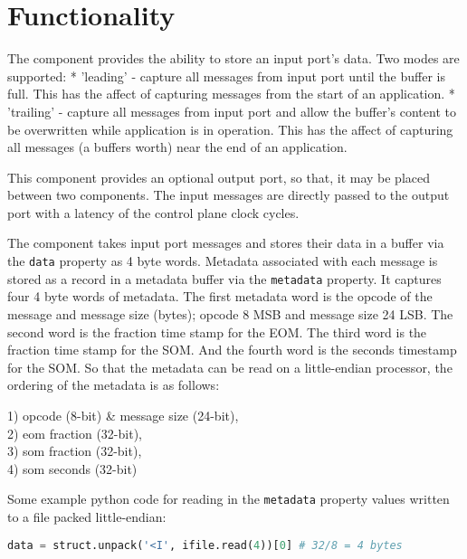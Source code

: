 \section*{Functionality}
\begin{flushleft}

The {\comp} component provides the ability to store an input port's
data. Two modes are supported: \newline
* 'leading' - capture all messages from input port until the buffer is full. This has the affect of capturing messages from the start of an application. \newline
* 'trailing' - capture all messages from input port and allow the buffer's content to be overwritten while application is in operation. This has the affect of capturing all messages (a buffers worth) near the end of an application. \newline

This component provides an optional output port, so that, it may be
placed between two components. The input messages are directly passed to
the output port with a latency of the control plane clock cycles. \newline

The {\comp} component takes input port messages and stores their data in a buffer via the \texttt{data} property as 4 byte words. Metadata associated with each message is stored as a record in a metadata buffer via the \texttt{metadata} property. It captures four 4 byte words of metadata. The first metadata word is the opcode of the message and message size (bytes); opcode 8 MSB and message size 24 LSB. The second word is the fraction time stamp for the EOM. The third word is the fraction time stamp for the SOM. And the fourth word is the seconds timestamp for the SOM. So that the metadata can be read on a little-endian processor, the ordering of the metadata is as follows: \newline

1) opcode (8-bit) \& message size (24-bit), \\
2) eom fraction (32-bit), \\
3) som fraction (32-bit), \\
4) som seconds (32-bit) \newline

Some example python code for reading in the \texttt{metadata} property values written to a file packed little-endian:
    \begin{lstlisting}[language=Python]
    data = struct.unpack('<I', ifile.read(4))[0] # 32/8 = 4 bytes
    \end{lstlisting}



\end{flushleft}
